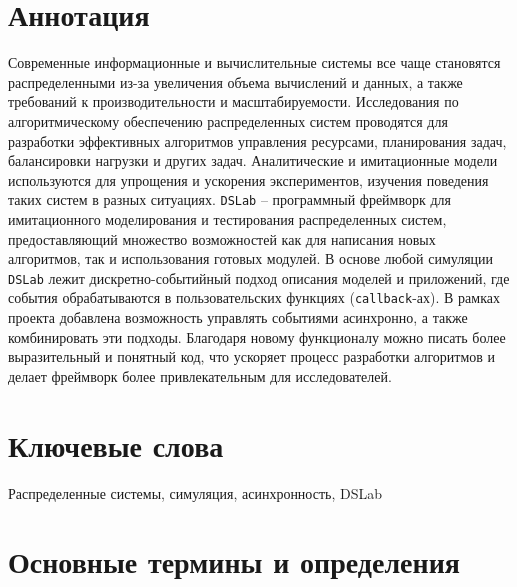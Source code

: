 
\section*{Аннотация}

Современные информационные и вычислительные системы все чаще становятся распределенными из-за увеличения объема вычислений и данных, а также требований к производительности и масштабируемости. Исследования по алгоритмическому обеспечению распределенных систем проводятся для разработки эффективных алгоритмов управления ресурсами, планирования задач, балансировки нагрузки и других задач. Аналитические и имитационные модели используются для упрощения и ускорения экспериментов, изучения поведения таких систем в разных ситуациях.
\texttt{DSLab} -- программный фреймворк для имитационного моделирования и тестирования распределенных систем, предоставляющий множество возможностей как для написания новых алгоритмов, так и использования готовых модулей. В основе любой симуляции \texttt{DSLab} лежит дискретно-событийный подход описания моделей и приложений, где события обрабатываются в пользовательских функциях (\texttt{callback}-ах). В рамках проекта добавлена возможность управлять событиями асинхронно, а также комбинировать эти подходы. Благодаря новому функционалу можно писать более выразительный и понятный код, что ускоряет процесс разработки алгоритмов и делает фреймворк более привлекательным для исследователей. 

\section*{Ключевые слова}

Распределенные системы, симуляция, асинхронность, DSLab


\newpage 

\section{Основные термины и определения}

